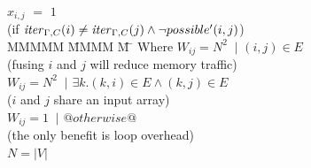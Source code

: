 \begin{tabbing}
\\[0.5ex]
           \> $x_{i,j}$    \> $=$   \> $1$             \>       \>            \\
           \> (if $\mathit{iter}_{\Gamma,C}(i) \not= \mathit{iter}_{\Gamma,C}(j) \wedge \neg possible'(i,j)$) 
\\[0.5ex]
MMMMM   \= MMMM \= M \= \kill
Where      \> $W_{ij} = N^2$ \> $~|$ \> $(i,j) \in E $         \\
           \> \> \> (fusing $i$ and $j$ will reduce memory traffic)         \\
           \> $W_{ij} = N^2$ \> $~|$ \> $\exists k. (k,i) \in E \wedge (k,j) \in E $     \\
           \> \> \> ($i$ and $j$ share an input array)                                         \\
           \> $W_{ij} = 1$   \> $~|$ \> $@otherwise@$                                                  \\
           \> \> \> (the only benefit is loop overhead)                                        
\\
           \> $N = |V|$
\end{tabbing}

% 
